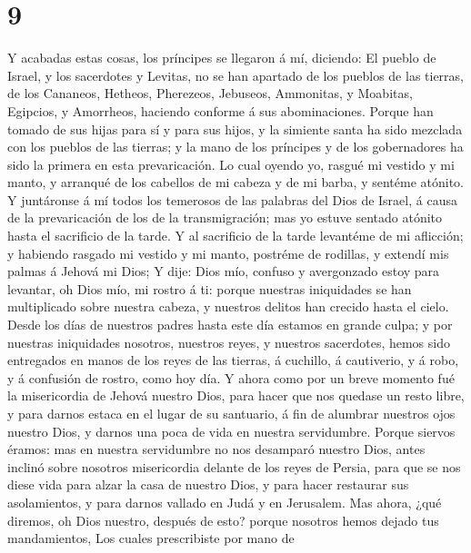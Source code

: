 \hypertarget{section-8}{%
\section{9}\label{section-8}}

 Y acabadas estas cosas, los príncipes se llegaron á mí,
diciendo: El pueblo de Israel, y los sacerdotes y Levitas, no se han
apartado de los pueblos de las tierras, de los Cananeos, Hetheos,
Pherezeos, Jebuseos, Ammonitas, y Moabitas, Egipcios, y Amorrheos,
haciendo conforme á sus abominaciones.  Porque han tomado
de sus hijas para sí y para sus hijos, y la simiente santa ha sido
mezclada con los pueblos de las tierras; y la mano de los príncipes y de
los gobernadores ha sido la primera en esta prevaricación.
 Lo cual oyendo yo, rasgué mi vestido y mi manto, y
arranqué de los cabellos de mi cabeza y de mi barba, y sentéme atónito.
 Y juntáronse á mí todos los temerosos de las palabras del
Dios de Israel, á causa de la prevaricación de los de la transmigración;
mas yo estuve sentado atónito hasta el sacrificio de la tarde.
 Y al sacrificio de la tarde levantéme de mi aflicción; y
habiendo rasgado mi vestido y mi manto, postréme de rodillas, y extendí
mis palmas á Jehová mi Dios;  Y dije: Dios mío, confuso y
avergonzado estoy para levantar, oh Dios mío, mi rostro á ti: porque
nuestras iniquidades se han multiplicado sobre nuestra cabeza, y
nuestros delitos han crecido hasta el cielo.  Desde los
días de nuestros padres hasta este día estamos en grande culpa; y por
nuestras iniquidades nosotros, nuestros reyes, y nuestros sacerdotes,
hemos sido entregados en manos de los reyes de las tierras, á cuchillo,
á cautiverio, y á robo, y á confusión de rostro, como hoy día.
 Y ahora como por un breve momento fué la misericordia de
Jehová nuestro Dios, para hacer que nos quedase un resto libre, y para
darnos estaca en el lugar de su santuario, á fin de alumbrar nuestros
ojos nuestro Dios, y darnos una poca de vida en nuestra servidumbre.
 Porque siervos éramos: mas en nuestra servidumbre no nos
desamparó nuestro Dios, antes inclinó sobre nosotros misericordia
delante de los reyes de Persia, para que se nos diese vida para alzar la
casa de nuestro Dios, y para hacer restaurar sus asolamientos, y para
darnos vallado en Judá y en Jerusalem.  Mas ahora, ¿qué
diremos, oh Dios nuestro, después de esto? porque nosotros hemos dejado
tus mandamientos,  Los cuales prescribiste por mano de

